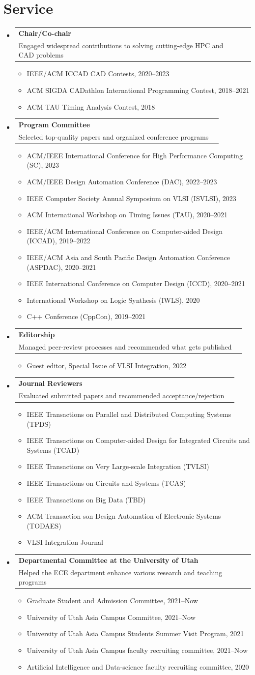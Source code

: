 \documentclass[A4,11pt]{article}
\makeatletter
\newcommand{\CVItem}[1]{
  \item\small{
    {#1 \vspace{-2pt}}
  }
}
\newcommand{\CVSubheading}[4]{
  \vspace{-2pt}\item
    \begin{tabular*}{0.97\textwidth}[t]{l@{\extracolsep{\fill}}r}
      \textbf{#1} & #2 \\
      \small#3 & \small #4 \\
    \end{tabular*}\vspace{-7pt}
}
\newcommand{\CVSubHeadingListStart}{\begin{itemize}[leftmargin=0.5cm, label={}]}
\newcommand{\CVSubHeadingListEnd}{\end{itemize}}
\newcommand{\CVItemListStart}{\begin{itemize}}
\newcommand{\CVItemListEnd}{\end{itemize}\vspace{-5pt}}
\makeatother
\begin{document}
\section{Service}
  \CVSubHeadingListStart
    
    \CVSubheading
      {Chair/Co-chair}{}
      {Engaged widespread contributions to solving cutting-edge HPC and CAD problems}{}
      \CVItemListStart
        \CVItem{IEEE/ACM ICCAD CAD Contests, 2020--2023}
        \CVItem{ACM SIGDA CADathlon International Programming Contest, 2018--2021}
        \CVItem{ACM TAU Timing Analysis Contest, 2018}
      \CVItemListEnd
     
    \CVSubheading
      {Program Committee}{}
      {Selected top-quality papers and organized conference programs}{}
      \CVItemListStart
        \CVItem{ACM/IEEE International Conference for High Performance Computing (SC), 2023}
        \CVItem{ACM/IEEE Design Automation Conference (DAC), 2022--2023}
        \CVItem{IEEE Computer Society Annual Symposium on VLSI (ISVLSI), 2023}
        \CVItem{ACM International Workshop on Timing Issues (TAU), 2020--2021}
        \CVItem{IEEE/ACM International Conference on Computer-aided Design (ICCAD), 2019--2022}
        \CVItem{IEEE/ACM Asia and South Pacific Design Automation Conference (ASPDAC), 2020--2021}
        \CVItem{IEEE International Conference on Computer Design (ICCD), 2020--2021}
        \CVItem{International Workshop on Logic Synthesis (IWLS), 2020}
        \CVItem{C++ Conference (CppCon), 2019--2021}
      \CVItemListEnd
    
    \CVSubheading
      {Editorship}{}
      {Managed peer-review processes and recommended what gets published}{}
      \CVItemListStart
        \CVItem{Guest editor, Special Issue of VLSI Integration, 2022}
      \CVItemListEnd
    
    \CVSubheading
      {Journal Reviewers}{}
      {Evaluated submitted papers and recommended acceptance/rejection}{}
      \CVItemListStart
        \CVItem{IEEE Transactions on Parallel and Distributed Computing Systems (TPDS)}
        \CVItem{IEEE Transactions on Computer-aided Design for Integrated Circuits and Systems (TCAD)}
        \CVItem{IEEE Transactions on Very Large-scale Integration (TVLSI)}
        \CVItem{IEEE Transactions on Circuits and Systems (TCAS)}
        \CVItem{IEEE Transactions on Big Data (TBD)}
        \CVItem{ACM Transaction son Design Automation of Electronic Systems (TODAES)}
        \CVItem{VLSI Integration Journal}
      \CVItemListEnd
    
    \CVSubheading
      {Departmental Committee at the University of Utah}{}
      {Helped the ECE department enhance various research and teaching programs}{}
      \CVItemListStart
        \CVItem{Graduate Student and Admission Committee, 2021--Now}
        \CVItem{University of Utah Asia Campus Committee, 2021--Now}
        \CVItem{University of Utah Asia Campus Students Summer Visit Program, 2021}
        \CVItem{University of Utah Asia Campus faculty recruiting committee, 2021--Now}
        \CVItem{Artificial Intelligence and Data-science faculty recruiting committee, 2020}
      \CVItemListEnd
  \CVSubHeadingListEnd
\end{document}
